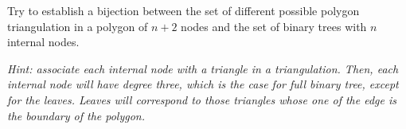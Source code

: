 
\begin{ex}
\item Try to establish a bijection between the set of different possible polygon triangulation in a polygon of $n+2$ nodes and the set of binary trees with $n$ internal nodes.

\textit{Hint: associate each internal node with a triangle in a triangulation. Then, each internal node will have degree three, which is the case for full binary tree, except for the leaves. Leaves will correspond to those triangles whose one of the edge is the boundary of the polygon.}
\end{ex}

 

